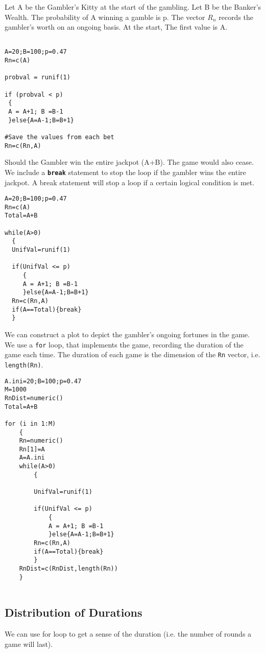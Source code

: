 \documentclass[a4paper,12pt]{article}
\begin{document}
\newpage
Let A be the Gambler's Kitty at the start of the gambling.
Let B be the Banker's Wealth.
The probability of A winning a gamble is p.
The vector $R_n$ records the gambler's worth on an ongoing basis. At the start, The first value is A.
\begin{framed}
\begin{verbatim}

A=20;B=100;p=0.47
Rn=c(A)

probval = runif(1)

if (probval < p)
 {
 A = A+1; B =B-1
 }else{A=A-1;B=B+1}

#Save the values from each bet
Rn=c(Rn,A)
\end{verbatim}
\end{framed}
\newpage
Should the Gambler win the entire jackpot (A+B). The game would also cease. We include a \textbf{\texttt{break}} statement to stop the loop if the gambler wins the entire jackpot. A break statement will stop a loop if a certain logical condition is met.

\begin{framed}
\begin{verbatim}
A=20;B=100;p=0.47
Rn=c(A)
Total=A+B

while(A>0)
  {
  UnifVal=runif(1)

  if(UnifVal <= p)
     {
     A = A+1; B =B-1
     }else{A=A-1;B=B+1}
  Rn=c(Rn,A)
  if(A==Total){break}
  }
\end{verbatim}
\end{framed}
We can construct a plot to depict the gambler's ongoing fortunes in the game. We use a \texttt{for} loop, that implements the game, recording the duration of the game each time. The duration of each game is the dimension of the \texttt{Rn} vector, i.e. \texttt{length(Rn)}.


\begin{framed}
\begin{verbatim}
A.ini=20;B=100;p=0.47
M=1000
RnDist=numeric()
Total=A+B

for (i in 1:M)
    {
    Rn=numeric()
    Rn[1]=A
    A=A.ini
    while(A>0)
        {
       
        UnifVal=runif(1)

        if(UnifVal <= p)
            {
            A = A+1; B =B-1
            }else{A=A-1;B=B+1}
        Rn=c(Rn,A)
        if(A==Total){break}
        }
    RnDist=c(RnDist,length(Rn))
    }
    

\end{verbatim}
\end{framed}
\subsection{Distribution of Durations}
We can use for loop to get a sense of the duration (i.e. the number of rounds a game will last).
\newpage
\end{document}
